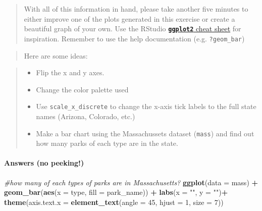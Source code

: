 \documentclass[]{book}
\newenvironment{Shaded}{\begin{snugshade}}{\end{snugshade}}
\newcommand{\CommentTok}[1]{\textcolor[rgb]{0.56,0.35,0.01}{\textit{#1}}}
\newcommand{\DataTypeTok}[1]{\textcolor[rgb]{0.13,0.29,0.53}{#1}}
\newcommand{\DecValTok}[1]{\textcolor[rgb]{0.00,0.00,0.81}{#1}}
\newcommand{\KeywordTok}[1]{\textcolor[rgb]{0.13,0.29,0.53}{\textbf{#1}}}
\newcommand{\NormalTok}[1]{#1}
\newcommand{\OperatorTok}[1]{\textcolor[rgb]{0.81,0.36,0.00}{\textbf{#1}}}
\newcommand{\StringTok}[1]{\textcolor[rgb]{0.31,0.60,0.02}{#1}}
\providecommand{\tightlist}{%
  \setlength{\itemsep}{0pt}\setlength{\parskip}{0pt}}
\let\oldparagraph\paragraph
\renewcommand{\paragraph}[1]{\oldparagraph{#1}\mbox{}}
\begin{document}
\begin{quote}
With all of this information in hand, please take another five minutes to either
improve one of the plots generated in this exercise or create a beautiful graph
of your own. Use the RStudio \href{https://www.rstudio.com/wp-content/uploads/2016/11/ggplot2-cheatsheet-2.1.pdf}{\textbf{\texttt{ggplot2}} cheat sheet} for
inspiration. Remember to use the help documentation (e.g. \texttt{?geom\_bar})
\end{quote}

\begin{quote}
Here are some ideas:
\end{quote}

\begin{quote}
\begin{itemize}
\tightlist
\item
  Flip the x and y axes.
\item
  Change the color palette used
\item
  Use \texttt{scale\_x\_discrete} to change the x-axis tick labels to the full state names (Arizona, Colorado, etc.)
\item
  Make a bar chart using the Massachussets dataset (\texttt{mass}) and find out how many parks of each type are in the state.
\end{itemize}
\end{quote}

\hypertarget{answers-no-peeking-1}{%
\paragraph{Answers (no peeking!)}\label{answers-no-peeking-1}}

\begin{Shaded}
\begin{Highlighting}[]
\CommentTok{#how many of each types of parks are in Massachusetts?}
\KeywordTok{ggplot}\NormalTok{(}\DataTypeTok{data =}\NormalTok{ mass) }\OperatorTok{+}\StringTok{ }
\StringTok{      }\KeywordTok{geom_bar}\NormalTok{(}\KeywordTok{aes}\NormalTok{(}\DataTypeTok{x =}\NormalTok{ type, }\DataTypeTok{fill =}\NormalTok{ park_name)) }\OperatorTok{+}
\StringTok{  }\KeywordTok{labs}\NormalTok{(}\DataTypeTok{x =} \StringTok{""}\NormalTok{,}
       \DataTypeTok{y =} \StringTok{""}\NormalTok{)}\OperatorTok{+}
\StringTok{  }\KeywordTok{theme}\NormalTok{(}\DataTypeTok{axis.text.x =} \KeywordTok{element_text}\NormalTok{(}\DataTypeTok{angle =} \DecValTok{45}\NormalTok{, }\DataTypeTok{hjust =} \DecValTok{1}\NormalTok{, }\DataTypeTok{size =} \DecValTok{7}\NormalTok{))}
\end{Highlighting}
\end{Shaded}
\end{document}
